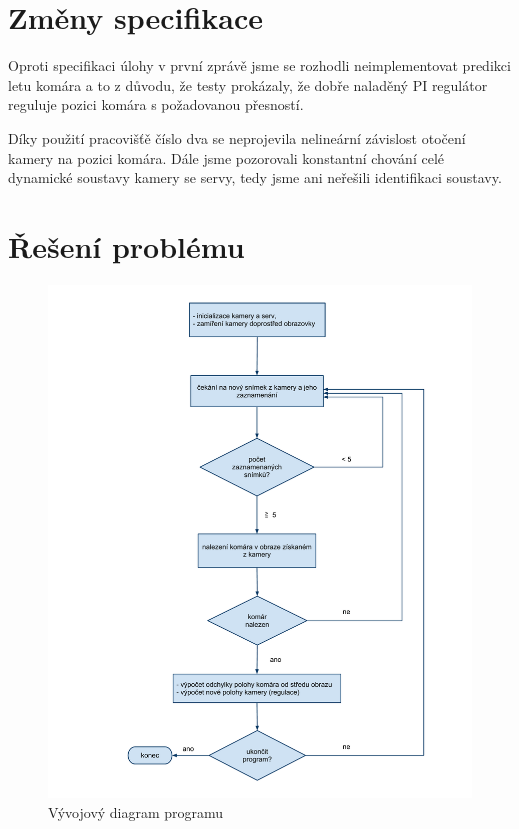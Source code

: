 \documentclass[a4paper,10pt]{article}
\begin{document}
\section{Změny specifikace}

		Oproti specifikaci úlohy v první zprávě jsme se rozhodli neimplementovat predikci letu komára 
		a to z důvodu, že testy prokázaly, že dobře naladěný PI regulátor reguluje pozici komára s požadovanou 
		přesností.

		Díky použití pracovišťě číslo dva se neprojevila nelineární závislost otočení kamery na pozici komára. 
		Dále jsme pozorovali konstantní chování celé dynamické soustavy kamery se servy, tedy jsme ani neřešili 
		identifikaci soustavy.
		
\section{Řešení problému}

		\begin{figure}[!h]
			\centering
			 \includegraphics[width=1\columnwidth]{pics/vyvojovy_diagram_programu}
			 \caption{Vývojový diagram programu}\label{fig:Diagram_programu}
		\end{figure}
\end{document}
